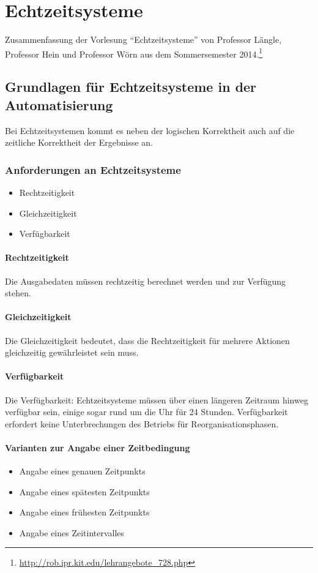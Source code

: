\chapter{Echtzeitsysteme}

Zusammenfassung der Vorlesung "`Echtzeitsysteme"' von Professor Längle, Professor Hein und Professor Wörn aus dem Sommersemester 2014.\footnote{\url{http://rob.ipr.kit.edu/lehrangebote_728.php}}



\section{Grundlagen für Echtzeitsysteme in der Automatisierung}

Bei Echtzeitsystemen kommt es neben der logischen Korrektheit auch auf die zeitliche Korrektheit der Ergebnisse an.

\subsection{Anforderungen an Echtzeitsysteme}
\begin{itemize}
	\item Rechtzeitigkeit
	\item Gleichzeitigkeit
	\item Verfügbarkeit
\end{itemize}

\subsubsection{Rechtzeitigkeit}
Die Ausgabedaten müssen rechtzeitig berechnet werden und zur Verfügung stehen.

\subsubsection{Gleichzeitigkeit}
Die Gleichzeitigkeit bedeutet, dass die Rechtzeitigkeit für mehrere Aktionen gleichzeitig gewährleistet sein muss.

\subsubsection{Verfügbarkeit}
Die Verfügbarkeit: Echtzeitsysteme müssen über einen längeren Zeitraum hinweg verfügbar sein, einige sogar rund um die Uhr für 24 Stunden. Verfügbarkeit erfordert keine Unterbrechungen des Betriebs für Reorganisationsphasen.


\subsubsection{Varianten zur Angabe einer Zeitbedingung}
\begin{itemize}
	\item Angabe eines genauen Zeitpunkts
	\item Angabe eines spätesten Zeitpunkts
	\item Angabe eines frühesten Zeitpunkts
	\item Angabe eines Zeitintervalles
\end{itemize}

